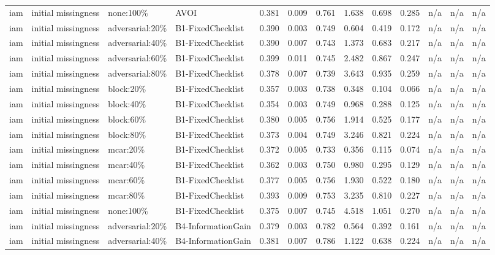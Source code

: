 \begin{table}[!ht]
{\begin{tabular}{lllllllllllll}
iam & initial missingness & none:100\% & AVOI & 0.381 & 0.009 & 0.761 & 1.638 & 0.698 & 0.285 & n/a & n/a & n/a \\
iam & initial missingness & adversarial:20\% & B1-FixedChecklist & 0.390 & 0.003 & 0.749 & 0.604 & 0.419 & 0.172 & n/a & n/a & n/a \\
iam & initial missingness & adversarial:40\% & B1-FixedChecklist & 0.390 & 0.007 & 0.743 & 1.373 & 0.683 & 0.217 & n/a & n/a & n/a \\
iam & initial missingness & adversarial:60\% & B1-FixedChecklist & 0.399 & 0.011 & 0.745 & 2.482 & 0.867 & 0.247 & n/a & n/a & n/a \\
iam & initial missingness & adversarial:80\% & B1-FixedChecklist & 0.378 & 0.007 & 0.739 & 3.643 & 0.935 & 0.259 & n/a & n/a & n/a \\
iam & initial missingness & block:20\% & B1-FixedChecklist & 0.357 & 0.003 & 0.738 & 0.348 & 0.104 & 0.066 & n/a & n/a & n/a \\
iam & initial missingness & block:40\% & B1-FixedChecklist & 0.354 & 0.003 & 0.749 & 0.968 & 0.288 & 0.125 & n/a & n/a & n/a \\
iam & initial missingness & block:60\% & B1-FixedChecklist & 0.380 & 0.005 & 0.756 & 1.914 & 0.525 & 0.177 & n/a & n/a & n/a \\
iam & initial missingness & block:80\% & B1-FixedChecklist & 0.373 & 0.004 & 0.749 & 3.246 & 0.821 & 0.224 & n/a & n/a & n/a \\
iam & initial missingness & mcar:20\% & B1-FixedChecklist & 0.372 & 0.005 & 0.733 & 0.356 & 0.115 & 0.074 & n/a & n/a & n/a \\
iam & initial missingness & mcar:40\% & B1-FixedChecklist & 0.362 & 0.003 & 0.750 & 0.980 & 0.295 & 0.129 & n/a & n/a & n/a \\
iam & initial missingness & mcar:60\% & B1-FixedChecklist & 0.377 & 0.005 & 0.756 & 1.930 & 0.522 & 0.180 & n/a & n/a & n/a \\
iam & initial missingness & mcar:80\% & B1-FixedChecklist & 0.393 & 0.009 & 0.753 & 3.235 & 0.810 & 0.227 & n/a & n/a & n/a \\
iam & initial missingness & none:100\% & B1-FixedChecklist & 0.375 & 0.007 & 0.745 & 4.518 & 1.051 & 0.270 & n/a & n/a & n/a \\
iam & initial missingness & adversarial:20\% & B4-InformationGain & 0.379 & 0.003 & 0.782 & 0.564 & 0.392 & 0.161 & n/a & n/a & n/a \\
iam & initial missingness & adversarial:40\% & B4-InformationGain & 0.381 & 0.007 & 0.786 & 1.122 & 0.638 & 0.224 & n/a & n/a & n/a \\

\end{tabular}}
\end{table}
